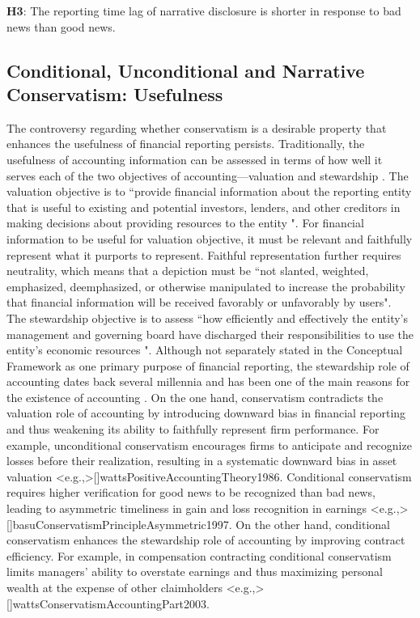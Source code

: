 \documentclass[a4paper]{article}
\begin{document}
\begin{spacing}{2}
\begin{center}
	\textbf{H3}: The reporting time lag of narrative disclosure is shorter in response to bad news than good news.
\end{center}

\subsection{Conditional, Unconditional and Narrative Conservatism: Usefulness}
The controversy regarding whether conservatism is a desirable property that enhances the usefulness of financial reporting persists. Traditionally, the usefulness of accounting information can be assessed in terms of how well it serves each of the two objectives of accounting---valuation and stewardship . The valuation objective is to ``provide financial information about the reporting entity that is useful to existing and potential investors, lenders, and other creditors in making decisions about providing resources to the entity \cite[OB2]{fasbConceptualFrameworkFinancial2018b}". For financial information to be useful for valuation objective, it must be relevant and faithfully represent what it purports to represent. Faithful representation further requires neutrality, which means that a depiction must be ``not slanted, weighted, emphasized, deemphasized, or otherwise manipulated to increase the probability that financial information will be received favorably or unfavorably by users". The stewardship objective is to assess ``how efficiently and effectively the entity's management and governing board have discharged their responsibilities to use the entity's economic resources \cite[OB4]{fasbConceptualFrameworkFinancial2018b}". Although not separately stated in the Conceptual Framework as one primary purpose of financial reporting, the stewardship role of accounting dates back several millennia and has been one of the main reasons for the existence of accounting \cite{lennardStewardshipObjectivesFinancial2007, murphyDiscoursesSurroundingEvolution2013, pelgerPracticesStandardsettingAnalysis2016}. On the one hand, conservatism contradicts the valuation role of accounting by introducing downward bias in financial reporting and thus weakening its ability to faithfully represent firm performance. For example, unconditional conservatism encourages firms to anticipate and recognize losses before their realization, resulting in a systematic downward bias in asset valuation \fullcite<e.g.,>[]{wattsPositiveAccountingTheory1986}. Conditional conservatism requires higher verification for good news to be recognized than bad news, leading to asymmetric timeliness in gain and loss recognition in earnings \fullcite<e.g.,>[]{basuConservatismPrincipleAsymmetric1997}. On the other hand, conditional conservatism enhances the stewardship role of accounting by improving contract efficiency. For example, in compensation contracting conditional conservatism limits managers' ability to overstate earnings and thus maximizing personal wealth at the expense of other claimholders \fullcite<e.g.,>[]{wattsConservatismAccountingPart2003}.


\end{spacing}
\end{document}
